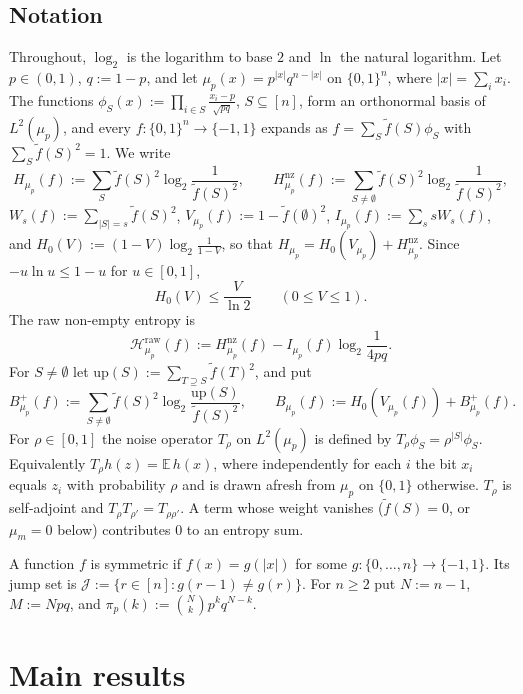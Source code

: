 \documentclass[11pt]{amsart}
\theoremstyle{remark}
\newcommand{\Hraw}{\mathcal{H}^{\mathrm{raw}}}
\newcommand{\up}{\mathrm{up}}
\newcommand{\J}{\mathcal{J}}
\newcommand{\ft}{\tilde f}
\begin{document}
\subsection{Notation}\label{ssec:notation}
Throughout, $\log_2$ is the logarithm to base $2$ and $\ln$ the natural logarithm. Let $p \in (0,1)$, $q := 1 - p$, and let $\mu_p(x) = p^{|x|} q^{n-|x|}$ on $\{0,1\}^n$, where $|x| = \sum_i x_i$. The functions $\phi_S(x) := \prod_{i \in S} \frac{x_i - p}{\sqrt{pq}}$, $S \subseteq [n]$, form an orthonormal basis of $L^2(\mu_p)$, and every $f : \{0,1\}^n \to \{-1,1\}$ expands as $f = \sum_S \ft(S) \phi_S$ with $\sum_S \ft(S)^2 = 1$. We write
\[
H_{\mu_p}(f) := \sum_{S} \ft(S)^2 \log_2 \frac{1}{\ft(S)^2}, \qquad
H^{\mathrm{nz}}_{\mu_p}(f) := \sum_{S \ne \emptyset} \ft(S)^2 \log_2 \frac{1}{\ft(S)^2},
\]
$W_s(f) := \sum_{|S| = s} \ft(S)^2$, $V_{\mu_p}(f) := 1 - \ft(\emptyset)^2$, $I_{\mu_p}(f) := \sum_{s} s W_s(f)$, and $H_0(V) := (1-V)\log_2\frac{1}{1-V}$, so that $H_{\mu_p} = H_0(V_{\mu_p}) + H^{\mathrm{nz}}_{\mu_p}$.
Since $-u\ln u \le 1 - u$ for $u \in [0,1]$,
\begin{equation}\label{eq:H0}
H_0(V) \le \frac{V}{\ln 2} \qquad (0 \le V \le 1).
\end{equation}
 The raw non-empty entropy is
\[
\Hraw_{\mu_p}(f) := H^{\mathrm{nz}}_{\mu_p}(f) - I_{\mu_p}(f) \log_2 \frac{1}{4pq} .
\]
For $S \ne \emptyset$ let $\up(S) := \sum_{T \supseteq S} \ft(T)^2$, and put
\[
B^+_{\mu_p}(f) := \sum_{S \ne \emptyset} \ft(S)^2 \log_2 \frac{\up(S)}{\ft(S)^2}, \qquad B_{\mu_p}(f) := H_0(V_{\mu_p}(f)) + B^+_{\mu_p}(f).
\]
For $\rho \in [0,1]$ the noise operator $T_\rho$ on $L^2(\mu_p)$ is defined by $T_\rho \phi_S = \rho^{|S|} \phi_S$. Equivalently $T_\rho h(z) = \mathbb{E}\, h(x)$, where independently for each $i$ the bit $x_i$ equals $z_i$ with probability $\rho$ and is drawn afresh from $\mu_p$ on $\{0,1\}$ otherwise. $T_\rho$ is self-adjoint and $T_\rho T_{\rho'} = T_{\rho\rho'}$. A term whose weight vanishes ($\ft(S) = 0$, or $\mu_m = 0$ below) contributes $0$ to an entropy sum.

A function $f$ is symmetric if $f(x) = g(|x|)$ for some $g : \{0, \dots, n\} \to \{-1,1\}$. Its jump set is $\J := \{ r \in [n] : g(r-1) \ne g(r) \}$. For $n \ge 2$ put $N := n-1$, $M := Npq$, and $\pi_p(k) := \binom{N}{k} p^k q^{N-k}$.

\section{Main results}\label{sec:results}
\end{document}
